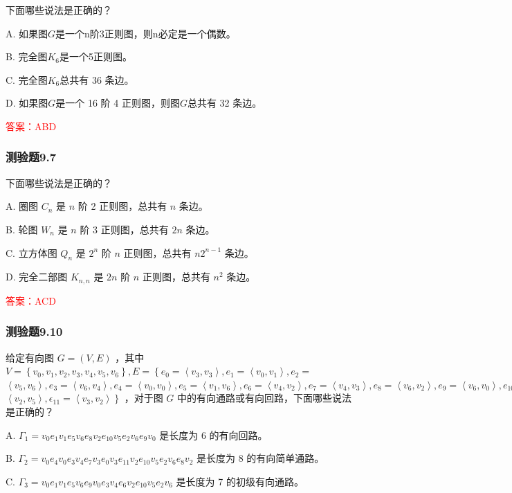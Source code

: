\documentclass[UTF8, heading=true]{ctexart}
\begin{document}
下面哪些说法是正确的？

A. 如果图$G$是一个n阶3正则图，则n必定是一个偶数。

B. 完全图$K_6$是一个5正则图。

C. 完全图$K_6$总共有 36 条边。

D. 如果图$G$是一个 16 阶 4 正则图，则图$G$总共有 32 条边。

\textcolor{red}{答案：ABD}

\subsubsection{测验题9.7}

下面哪些说法是正确的？

A. 圈图 $C_n$ 是 $n$ 阶 2 正则图，总共有 $n$ 条边。

B. 轮图 $W_n$ 是 $n$ 阶 3 正则图，总共有 $2 n$ 条边。

C. 立方体图 $Q_n$ 是 $2^n$ 阶 $n$ 正则图，总共有 $n 2^{n-1}$ 条边。

D. 完全二部图 $K_{n, n}$ 是 $2 n$ 阶 $n$ 正则图，总共有 $n^2$ 条边。

\textcolor{red}{答案：ACD}

\subsubsection{测验题9.10}

给定有向图 $G=(V, E)$ ，其中 $V=\left\{v_0, v_1, v_2, v_3, v_4, v_5, v_6\right\}, E=\left\{e_0=\left\langle v_3, v_3\right\rangle, e_1=\left\langle v_0, v_1\right\rangle, e_2=\right.$ $\left\langle v_5, v_6\right\rangle, e_3=\left\langle v_6, v_4\right\rangle, e_4=\left\langle v_0, v_0\right\rangle, e_5=\left\langle v_1, v_6\right\rangle, e_6=\left\langle v_4, v_2\right\rangle, e_7=\left\langle v_4, v_3\right\rangle, e_8=\left\langle v_6, v_2\right\rangle, e_9=\left\langle v_6, v_0\right\rangle, e_{10}=$ $\left.\left\langle v_2, v_5\right\rangle, \epsilon_{11}=\left\langle v_3, v_2\right\rangle\right\}$ ，对于图 $G$ 中的有向通路或有向回路，下面哪些说法是正确的？

A. $\Gamma_1=v_0 e_1 v_1 e_5 v_6 e_8 v_2 e_{10} v_5 e_2 v_6 e_9 v_0$ 是长度为 6 的有向回路。

B. $\Gamma_2=v_0 e_4 v_0 e_3 v_4 e_7 v_3 e_0 v_3 e_{11} v_2 e_{10} v_5 e_2 v_6 e_8 v_2$ 是长度为 8 的有向简单通路。

C. $\Gamma_3=v_0 e_1 v_1 e_5 v_6 e_9 v_0 e_3 v_4 e_6 v_2 e_{10} v_5 e_2 v_6$ 是长度为 7 的初级有向通路。
\end{document}
